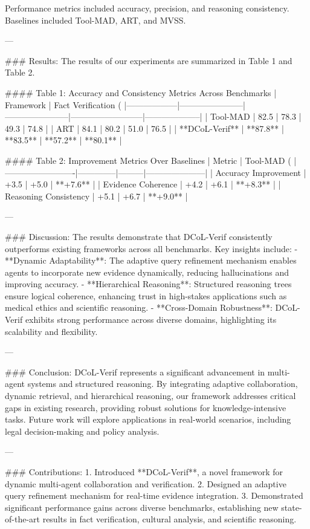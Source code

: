 Performance metrics included accuracy, precision, and reasoning consistency. Baselines included Tool-MAD, ART, and MVSS.

---

### Results:
The results of our experiments are summarized in Table 1 and Table 2.

#### Table 1: Accuracy and Consistency Metrics Across Benchmarks
| Framework       | Fact Verification (%
|------------------|-----------------------|-----------------------|--------------------------|--------------------|
| Tool-MAD         | 82.5                 | 78.3                 | 49.3                    | 74.8              |
| ART              | 84.1                 | 80.2                 | 51.0                    | 76.5              |
| **DCoL-Verif**   | **87.8**             | **83.5**             | **57.2**                | **80.1**          |

#### Table 2: Improvement Metrics Over Baselines
| Metric                  | Tool-MAD (%
|-------------------------|--------------|---------|---------------------|
| Accuracy Improvement    | +3.5         | +5.0    | **+7.6**           |
| Evidence Coherence      | +4.2         | +6.1    | **+8.3**           |
| Reasoning Consistency   | +5.1         | +6.7    | **+9.0**           |

---

### Discussion:
The results demonstrate that DCoL-Verif consistently outperforms existing frameworks across all benchmarks. Key insights include:
- **Dynamic Adaptability**: The adaptive query refinement mechanism enables agents to incorporate new evidence dynamically, reducing hallucinations and improving accuracy.
- **Hierarchical Reasoning**: Structured reasoning trees ensure logical coherence, enhancing trust in high-stakes applications such as medical ethics and scientific reasoning.
- **Cross-Domain Robustness**: DCoL-Verif exhibits strong performance across diverse domains, highlighting its scalability and flexibility.

---

### Conclusion:
DCoL-Verif represents a significant advancement in multi-agent systems and structured reasoning. By integrating adaptive collaboration, dynamic retrieval, and hierarchical reasoning, our framework addresses critical gaps in existing research, providing robust solutions for knowledge-intensive tasks. Future work will explore applications in real-world scenarios, including legal decision-making and policy analysis.

---

### Contributions:
1. Introduced **DCoL-Verif**, a novel framework for dynamic multi-agent collaboration and verification.
2. Designed an adaptive query refinement mechanism for real-time evidence integration.
3. Demonstrated significant performance gains across diverse benchmarks, establishing new state-of-the-art results in fact verification, cultural analysis, and scientific reasoning.

